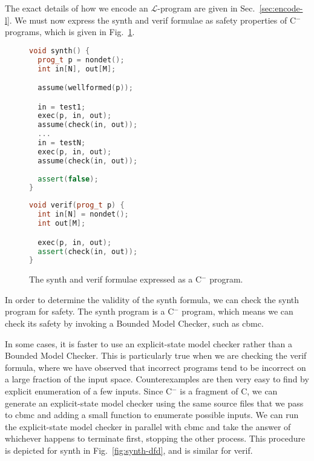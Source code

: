 \documentclass[a4paper]{llncs}
\newcommand{\newC}{C$^-$\xspace}
\begin{document}
The exact details of how we encode an $\mathcal{L}$-program are given in Sec.~\ref{sec:encode-l}.
We must now express the {\sc synth} and {\sc verif} formulae as safety properties
of \newC programs, which is given in Fig.~\ref{fig:c-synthverif}.

\begin{figure}
\centering
\begin{minipage}[t]{.45\textwidth}
\begin{lstlisting}[language=C++]
void synth() {
  prog_t p = nondet();
  int in[N], out[M];

  assume(wellformed(p));

  in = test1;
  exec(p, in, out);
  assume(check(in, out));
  ...
  in = testN;
  exec(p, in, out);
  assume(check(in, out));
  
  assert(false);
}
\end{lstlisting}
\end{minipage}
\hfill
\begin{minipage}[t]{.45\linewidth}
\begin{lstlisting}[language=C++]
void verif(prog_t p) {
  int in[N] = nondet();
  int out[M];

  exec(p, in, out);
  assert(check(in, out));
}
\end{lstlisting}
\end{minipage}

 \caption{The {\sc synth} and {\sc verif} formulae expressed as a \newC program.}
 \label{fig:c-synthverif}
\end{figure}

In order to determine the validity of the {\sc synth} formula, we can
check the {\sc synth} program for safety.  The {\sc synth} program is a
\newC program, which means we can check its safety by invoking a Bounded
Model Checker, such as {\sc cbmc}.

In some cases, it is faster to use an explicit-state model checker rather
than a Bounded Model Checker.  This is particularly true when we are checking
the {\sc verif} formula, where we have observed that incorrect programs tend
to be incorrect on a large fraction of the input space.  Counterexamples
are then very easy to find by explicit enumeration of a few inputs.
Since \newC is a fragment of C, we can generate an explicit-state
model checker using the same source files that we pass to {\sc cbmc}
and adding a small function to enumerate possible inputs.
We can run the explicit-state model checker
in parallel with {\sc cbmc} and take the answer of whichever happens
to terminate first, stopping the other process.  This procedure is
depicted for {\sc synth} in Fig.~\ref{fig:synth-dfd}, and is similar for {\sc verif}.
\end{document}
